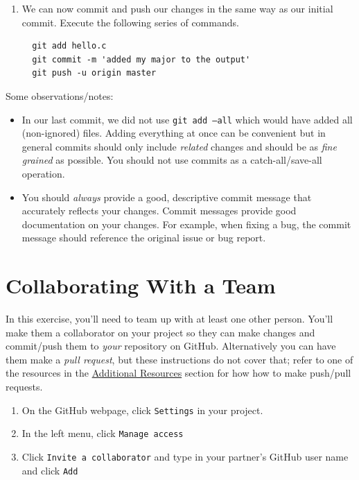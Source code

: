 \documentclass[12pt]{scrartcl}
\begin{document}
\begin{enumerate}
  \item We can now commit and push our changes in the same way
  as our initial commit.  Execute the following series of commands.
  
  \begin{verbatim}
  git add hello.c
  git commit -m 'added my major to the output'
  git push -u origin master  
  \end{verbatim}

\end{enumerate}
  
Some observations/notes:

\begin{itemize} 
  \item In our last commit, we did not use \texttt{git add --all} 
  which would have added all (non-ignored) files.  Adding everything at once
  can be convenient but in general commits should only include \emph{related}
  changes and should be as \emph{fine grained} as possible.  You should
  not use commits as a catch-all/save-all operation.

  \item You should \emph{always} provide a good, descriptive commit message
  that accurately reflects your changes.  Commit messages provide good
  documentation on your changes.  For example, when fixing a bug, the commit
  message should reference the original issue or bug report.  

\end{itemize}

\section{Collaborating With a Team}

In this exercise, you'll need to team up with at least one other person.
You'll make them a collaborator on your project so they can make changes
and commit/push them to \emph{your} repository on GitHub.  Alternatively
you can have them make a \emph{pull request}, but these instructions do 
not cover that; refer to one of the resources in the 
\hyperref[section:additionalResources]{Additional Resources} section
for how how to make push/pull requests.

\begin{enumerate}
  \item On the GitHub webpage, click \texttt{Settings} in your project.
  \item In the left menu, click \texttt{Manage access}
  \item Click \texttt{Invite a collaborator} and type 
  in your partner's GitHub user name and click \texttt{Add}
\end{enumerate}
\end{document}
